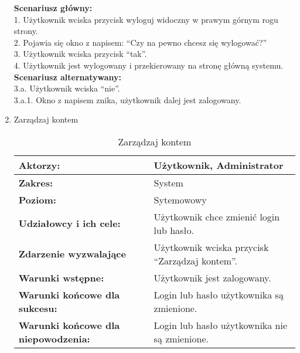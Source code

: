 \begin{enumerate}[label=(\Roman*)]
\textbf{Scenariusz główny:} \\
1. Użytkownik wciska przycisk wyloguj widoczny w prawym górnym rogu strony. \\
2. Pojawia się okno z napisem: “Czy na pewno chcesz się wylogować?” \\
3. Użytkownik wciska przycisk “tak”. \\
4. Użytkownik jest wylogowany i przekierowany na stronę główną systemu. \\
\textbf{Scenariusz alternatywany: \\
} 
3.a. Użytkownik wciska “nie”. \\
3.a.1. Okno z napisem znika, użytkownik dalej jest zalogowany. \\
\item Zarządzaj kontem
\begin{table}[h]
\centering
\caption{Zarządzaj kontem}
\label{zarzadzajkontem}
\begin{tabular}{|p{7cm}|p{7cm}|}
  \hline 
  \textbf{Aktorzy:} & Użytkownik, Administrator\\
  \hline
  \textbf{Zakres:} & System \\
	\hline
  \textbf{Poziom:} & Sytemowowy \\
	\hline
  \textbf{Udziałowcy i ich cele: } & Użytkownik chce zmienić login lub hasło. \\
	\hline
  \textbf{Zdarzenie wyzwalające } & Użytkownik wciska przycisk “Zarządzaj kontem”. \\
	\hline
  \textbf{Warunki wstępne: } & Użytkownik jest zalogowany.\\
	\hline
  \textbf{Warunki końcowe dla sukcesu:} & Login lub hasło użytkownika są zmienione.\\
	\hline
  \textbf{Warunki końcowe dla niepowodzenia:} & Login lub hasło użytkownika nie są zmienione. \\
  \hline
\end{tabular} 
\end{table}


\end{enumerate}
